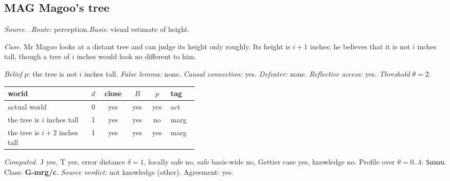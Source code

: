 \subsection*{MAG \enspace Magoo's tree}
\noindent\textit{Source.} \citet{Williamson2000}.\quad \textit{Route:} perception.\quad \textit{Basis:} visual estimate of height.\par
\noindent\textit{Case.} Mr Magoo looks at a distant tree and can judge its height only roughly. Its height is $i+1$ inches; he believes that it is not $i$ inches tall, though a tree of $i$ inches would look no different to him.\par
\noindent\textit{Belief} $p$: the tree is not $i$ inches tall.
 \textit{False lemma:} none. \textit{Causal connection:} yes. \textit{Defeater:} none. \textit{Reflective access:} yes. \textit{Threshold} $\theta = 2$.\par
\begin{center}\begin{tabular}{@{}p{0.43\linewidth}rcccl@{}}
world & $d$ & close & $B$ & $p$ & tag \\ \midrule
actual world & 0 & yes & yes & yes & act \\
the tree is $i$ inches tall & 1 & yes & yes & no & marg \\
the tree is $i+2$ inches tall & 1 & yes & yes & yes & marg \\
\end{tabular}\end{center}
\noindent\textit{Computed.} J yes, T yes, error distance $\delta = 1$, locally safe no, safe basis-wide no, Gettier case yes, knowledge no. Profile over $\theta = 0..4$: \texttt{Suuuu}. Class: \textbf{G-mrg/c}.
 \textit{Source verdict:} not knowledge (other). Agreement: yes.
\par\medskip
{}
